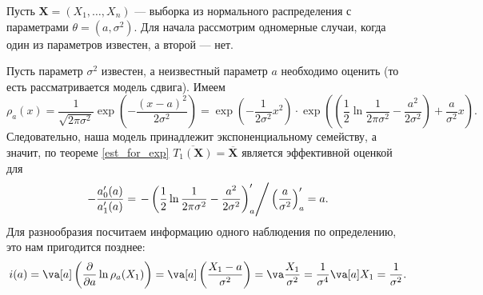 \begin{example}\label{fisher_norm}
    Пусть $\mathbf X = (X_1, \ldots, X_n)$ --- выборка из нормального распределения с параметрами $\theta = (a, \sigma^2)$. Для начала рассмотрим одномерные случаи, когда один из параметров известен, а второй --- нет.
    
    Пусть параметр $\sigma^2$ известен, а неизвестный параметр $a$ необходимо оценить (то есть рассматривается модель сдвига). Имеем $$\rho_{a}(x) = \frac{1}{\sqrt{2\pi\sigma^2}}\exp\left(-\frac{(x - a)^2}{2\sigma^2}\right) = \exp\left(- \frac{1}{2\sigma^2}x^2\right)\cdot \exp\left(\left(\frac12\ln{\frac{1}{2\pi\sigma^2}} - \frac{a^2}{2\sigma^2}\right) + \frac{a}{\sigma^2}x\right).$$
    Следовательно, наша модель принадлежит экспоненциальному семейству, а значит, по теореме \ref{est_for_exp} $\overline{T_1(\mathbf X)}=\overline{\mathbf X}$ является эффективной оценкой для
    $$-\frac{a_0'(a)}{a_1'(a)} = \left.-\left(\frac12\ln{\frac{1}{2\pi\sigma^2}} - \frac{a^2}{2\sigma^2}\right)'_a \right/ \left(\frac{a}{\sigma^2}\right)'_a = a.$$
    Для разнообразия посчитаем информацию одного наблюдения по определению, это нам пригодится позднее:
    \[
    i(a) = \va[a] \left(\frac{\partial}{\partial a} \ln{\rho_{a}(X_1)}\right) = \va[a] \left(\frac{X_1 - a}{\sigma^2}\right) = \va \frac{X_1}{\sigma^2} = \frac{1}{\sigma^4}\va[a] X_1 = \frac{1}{\sigma^2}.
    \]
    

\end{example}
